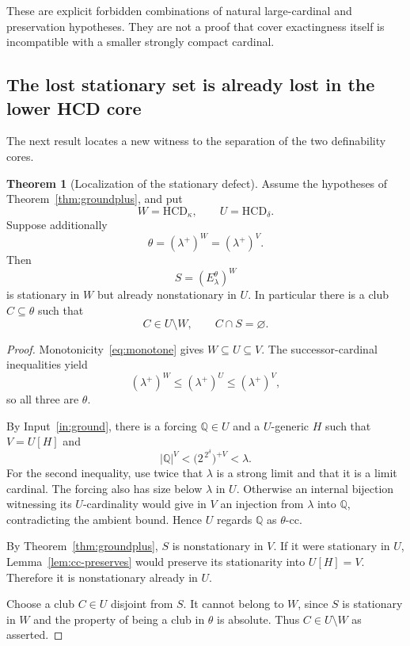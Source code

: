 \documentclass[11pt,letterpaper]{article}
\theoremstyle{definition}
\newtheorem{theorem}[definition]{Theorem}
\numberwithin{equation}{section}
\newcommand{\HCD}{\mathrm{HCD}}
\newcommand{\cc}{\text{-cc}}
\begin{document}
These are explicit forbidden combinations of natural large-cardinal and preservation hypotheses. They are not a proof that cover exactingness itself is incompatible with a smaller strongly compact cardinal.

\subsection{The lost stationary set is already lost in the lower HCD core}

The next result locates a new witness to the separation of the two definability cores.

\begin{samepage}
\begin{theorem}[Localization of the stationary defect]\label{thm:localize}
Assume the hypotheses of Theorem~\ref{thm:groundplus}, and put
\[
W=\HCD_\kappa,\qquad U=\HCD_\delta.
\]
Suppose additionally
\[
\theta=(\lambda^+)^W=(\lambda^+)^V.
\]
Then
\[
S=(E^\theta_\lambda)^W
\]
is stationary in $W$ but already nonstationary in $U$. In particular there is a club $C\subseteq\theta$ such that
\[
C\in U\setminus W,\qquad C\cap S=\varnothing.
\]
\end{theorem}
\end{samepage}

\begin{proof}
Monotonicity~\eqref{eq:monotone} gives $W\subseteq U\subseteq V$. The successor-cardinal inequalities yield
\[
(\lambda^+)^W\le(\lambda^+)^U\le(\lambda^+)^V,
\]
so all three are $\theta$.

By Input~\ref{in:ground}, there is a forcing $\mathbb Q\in U$ and a $U$-generic $H$ such that $V=U[H]$ and
\[
|\mathbb Q|^V<\bigl(2^{\,2^\delta}\bigr)^{+V}<\lambda.
\]
For the second inequality, use twice that $\lambda$ is a strong limit and that it is a limit cardinal. The forcing also has size below $\lambda$ in $U$. Otherwise an internal bijection witnessing its $U$-cardinality would give in $V$ an injection from $\lambda$ into $\mathbb Q$, contradicting the ambient bound. Hence $U$ regards $\mathbb Q$ as $\theta\cc$.

By Theorem~\ref{thm:groundplus}, $S$ is nonstationary in $V$. If it were stationary in $U$, Lemma~\ref{lem:cc-preserves} would preserve its stationarity into $U[H]=V$. Therefore it is nonstationary already in $U$.

Choose a club $C\in U$ disjoint from $S$. It cannot belong to $W$, since $S$ is stationary in $W$ and the property of being a club in $\theta$ is absolute. Thus $C\in U\setminus W$ as asserted.
\end{proof}
\end{document}
